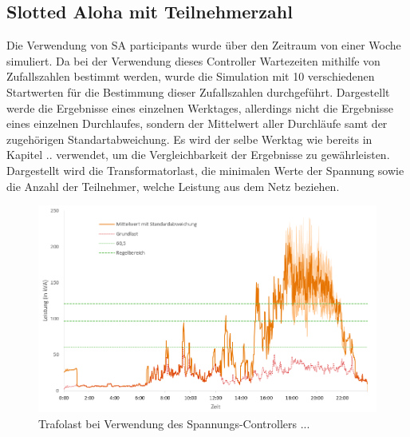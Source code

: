 \subsection{Slotted Aloha mit Teilnehmerzahl}
Die Verwendung von SA participants wurde über den Zeitraum von einer Woche simuliert. Da bei der Verwendung dieses Controller Wartezeiten mithilfe von Zufallszahlen bestimmt werden, wurde die Simulation mit 10 verschiedenen Startwerten für die Bestimmung dieser Zufallszahlen durchgeführt. Dargestellt werde die Ergebnisse eines einzelnen Werktages, allerdings nicht die Ergebnisse eines einzelnen Durchlaufes, sondern der Mittelwert aller Durchläufe samt der zugehörigen Standartabweichung. Es wird der selbe Werktag wie bereits in Kapitel .. verwendet, um die Vergleichbarkeit der Ergebnisse zu gewährleisten. Dargestellt wird die Transformatorlast, die minimalen Werte der Spannung sowie die Anzahl der Teilnehmer, welche Leistung aus dem Netz beziehen. \\
\begin{figure}[htb]
\centering
	\includegraphics[scale=0.7]{img/SA_par/TrafoLast_1911_5.png}
	\caption{Trafolast bei Verwendung des Spannungs-Controllers ...}
	\label{Abb_SAparTrafoLast}
\end{figure}

